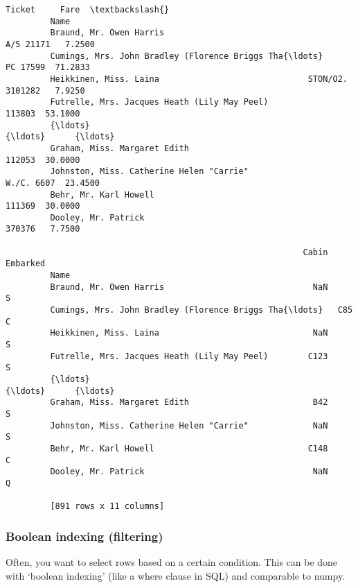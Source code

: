 \documentclass[11pt]{article}
\begin{document}
\begin{Verbatim}[commandchars=\\\{\}]
                                                                       Ticket     Fare  \textbackslash{}
         Name                                                                            
         Braund, Mr. Owen Harris                                    A/5 21171   7.2500   
         Cumings, Mrs. John Bradley (Florence Briggs Tha{\ldots}          PC 17599  71.2833   
         Heikkinen, Miss. Laina                              STON/O2. 3101282   7.9250   
         Futrelle, Mrs. Jacques Heath (Lily May Peel)                  113803  53.1000   
         {\ldots}                                                              {\ldots}      {\ldots}   
         Graham, Miss. Margaret Edith                                  112053  30.0000   
         Johnston, Miss. Catherine Helen "Carrie"                  W./C. 6607  23.4500   
         Behr, Mr. Karl Howell                                         111369  30.0000   
         Dooley, Mr. Patrick                                           370376   7.7500   
         
                                                            Cabin Embarked  
         Name                                                               
         Braund, Mr. Owen Harris                              NaN        S  
         Cumings, Mrs. John Bradley (Florence Briggs Tha{\ldots}   C85        C  
         Heikkinen, Miss. Laina                               NaN        S  
         Futrelle, Mrs. Jacques Heath (Lily May Peel)        C123        S  
         {\ldots}                                                  {\ldots}      {\ldots}  
         Graham, Miss. Margaret Edith                         B42        S  
         Johnston, Miss. Catherine Helen "Carrie"             NaN        S  
         Behr, Mr. Karl Howell                               C148        C  
         Dooley, Mr. Patrick                                  NaN        Q  
         
         [891 rows x 11 columns]
\end{Verbatim}
            
    \hypertarget{boolean-indexing-filtering}{%
\subsubsection{Boolean indexing
(filtering)}\label{boolean-indexing-filtering}}

    Often, you want to select rows based on a certain condition. This can be
done with `boolean indexing' (like a where clause in SQL) and comparable
to numpy.
\end{document}
